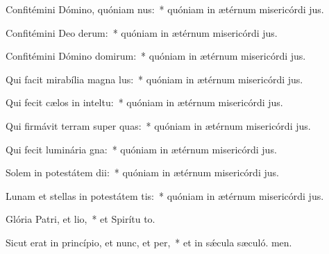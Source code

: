 \item Confitémini Dómino, quóniam nus:~* quóniam in ætérnum misericórdi jus.
\item Confitémini Deo derum:~* quóniam in ætérnum misericórdi jus.
\item Confitémini Dómino domirum:~* quóniam in ætérnum misericórdi jus.
\item Qui facit mirabília magna lus:~* quóniam in ætérnum misericórdi jus.
\item Qui fecit cælos in inteltu:~* quóniam in ætérnum misericórdi jus.
\item Qui firmávit terram super quas:~* quóniam in ætérnum misericórdi jus.
\item Qui fecit luminária gna:~* quóniam in ætérnum misericórdi jus.
\item Solem in potestátem dii:~* quóniam in ætérnum misericórdi jus.
\item Lunam et stellas in potestátem tis:~* quóniam in ætérnum misericórdi jus.
\item Glória Patri, et lio,~* et Spirítu to.
\item Sicut erat in princípio, et nunc, et per,~* et in sǽcula sæculó. men.
